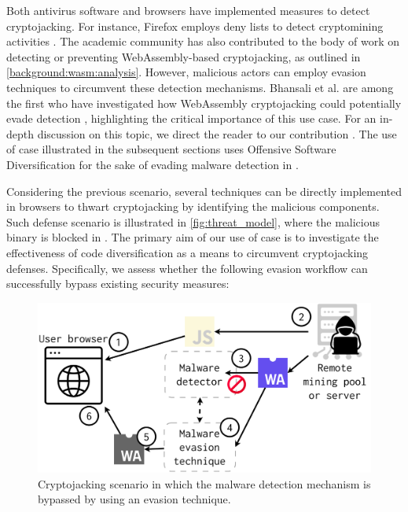 Both antivirus software and browsers have implemented measures to detect cryptojacking. For instance, Firefox employs deny lists to detect cryptomining activities \cite{firefoxcrypto}. 
The academic community has also contributed to the body of work on detecting or preventing WebAssembly-based cryptojacking, as outlined in \autoref{background:wasm:analysis}. 
However, malicious actors can employ evasion techniques to circumvent these detection mechanisms. 
Bhansali et al. are among the first who have investigated how WebAssembly cryptojacking could potentially evade detection \cite{10.1145/3507657.3528560}, highlighting the critical importance of this use case. 
For an in-depth discussion on this topic, we direct the reader to our contribution \cite{EVASION}.
The use of case illustrated in the subsequent sections uses Offensive Software Diversification for the sake of evading malware detection in \Wasm. 

\label{threat_model}


Considering the previous scenario, several techniques can be directly implemented in browsers to thwart cryptojacking by identifying the malicious \Wasm components. 
Such defense scenario is illustrated in \autoref{fig:threat_model}, where the \Wasm malicious binary is blocked in .
The primary aim of our use of case is to investigate the effectiveness of code diversification as a means to circumvent cryptojacking defenses. 
Specifically, we assess whether the following evasion workflow can successfully bypass existing security measures:

\begin{figure}
    \centering
    \includegraphics[width=0.8\linewidth]{figures/threat_model.pdf}
    \caption{Cryptojacking scenario in which the malware detection mechanism is bypassed by using an evasion technique.}
    \label{fig:threat_model}
\end{figure}


